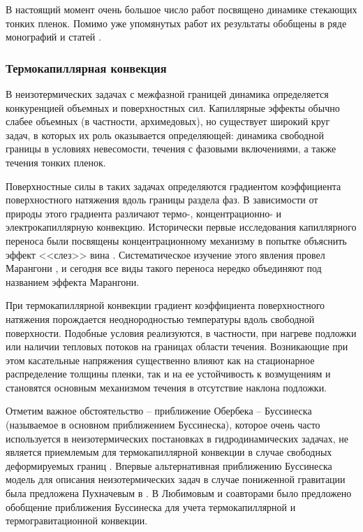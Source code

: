 \documentclass[12pt,a4paper]{article}
\begin{document}
В настоящий момент очень большое число работ посвящено динамике стекающих тонких пленок. Помимо уже упомянутых работ \cite{Oron1997, Chang2002, Craster2009} их результаты обобщены в ряде монографий и статей \cite{Alekseenko1994, Kalliadasis2012, RuyerQuil2014}.


\subsubsection{Термокапиллярная конвекция }

В неизотермических задачах с межфазной границей динамика определяется конкуренцией объемных и поверхностных сил. Капиллярные эффекты обычно слабее объемных (в частности, архимедовых), но существует широкий круг задач, в которых их роль оказывается определяющей: динамика свободной границы в условиях невесомости, течения с фазовыми включениями, а также течения тонких пленок.

Поверхностные силы в таких задачах определяются градиентом коэффициента поверхностного натяжения вдоль границы раздела фаз. В зависимости от природы этого градиента различают термо-, концентрационно- и электрокапиллярную конвекцию. Исторически первые исследования капиллярного переноса были посвящены концентрационному механизму в попытке объяснить эффект <<слез>> вина \cite{Thomson1855}. Систематическое изучение этого явления провел Марангони \cite{Marangoni1865}, и сегодня все виды такого переноса нередко объединяют под названием эффекта Марангони.

При термокапиллярной конвекции градиент коэффициента поверхностного натяжения порождается неоднородностью температуры вдоль свободной поверхности. Подобные условия реализуются, в частности, при нагреве подложки или наличии тепловых потоков на границах области течения. Возникающие при этом касательные напряжения существенно влияют как на стационарное распределение толщины пленки, так и на ее устойчивость к возмущениям и становятся основным механизмом течения в отсутствие наклона подложки.

Отметим важное обстоятельство -- приближение Обербека -- Буссинеска \cite{Oberbeck1879, Boussinesq1903} (называемое в основном приближением Буссинеска), которое очень часто используется в неизотермических постановках в гидродинамических задачах, не является приемлемым для термокапиллярной конвекции в случае свободных деформируемых границ \cite{Nepomniashchii1983, Drasin1981}. Впервые альтернативная приближению Буссинеска модель для описания неизотермических задач в случае пониженной гравитации была предложена Пухначевым в \cite{Pukhnachev1992}. В \cite{Lyubimov1998}  Любимовым и соавторами было предложено обобщение приближения Буссинеска для учета термокапиллярной и термогравитационной конвекции. 
\end{document}
